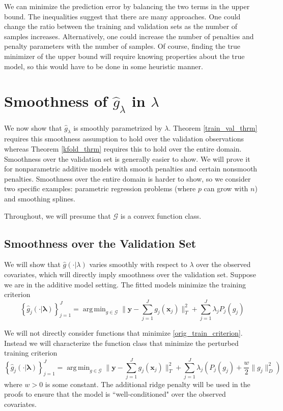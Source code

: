 \documentclass[12pt]{article}
\DeclareMathOperator*{\argmin}{arg\,min}
\begin{document}
We can minimize the prediction error by balancing the two terms in the upper bound. The inequalities suggest that there are many approaches. One could change the ratio between the training and validation sets as the number of samples increases. Alternatively, one could increase the number of penalties and penalty parameters with the number of samples. Of course, finding the true minimizer of the upper bound will require knowing properties about the true model, so this would have to be done in some heuristic manner.

\section{Smoothness of $\hat{g}_\lambda$ in $\lambda$}
\label{sec:entropy}

We now show that $\hat{g}_\lambda$ is smoothly parametrized by $\lambda$. Theorem \ref{train_val_thrm} requires this smoothness assumption to hold over the validation observations whereas Theorem \ref{kfold_thrm} requires this to hold over the entire domain. Smoothness over the validation set is generally easier to show. We will prove it for nonparametric additive models with smooth penalties and certain nonsmooth penalties. Smoothness over the entire domain is harder to show, so we consider two specific examples: parametric regression problems (where $p$ can grow with $n$) and smoothing splines.

Throughout, we will presume that $\mathcal{G}$ is a convex function class.

\subsection{Smoothness over the Validation Set}
\label{sec:smoothness_validation}
We will show that $\hat{g}(\cdot | \lambda)$ varies smoothly with respect to $\lambda$ over the observed covariates, which will directly imply smoothness over the validation set. Suppose we are in the additive model setting. The fitted models minimize the training criterion
\begin{equation}
\label{orig_train_criterion}
\left\{ \hat{g}_j(\cdot | \boldsymbol \lambda) \right \}_{j=1}^J = \argmin_{g\in \mathcal{G}} \| \boldsymbol y -  \sum_{j=1}^J g_j(\boldsymbol x_j) \|^2_T + \sum_{j=1}^J \lambda_j P_j(g_j)
\end{equation}

We will not directly consider functions that minimize \eqref{orig_train_criterion}. Instead we will characterize the function class that minimize the perturbed training criterion
\begin{equation}
\label{train_crit_ridge}
\left\{ \hat{g}_j(\cdot | \boldsymbol \lambda) \right \}_{j=1}^J = \argmin_{g\in \mathcal{G}} \| \boldsymbol y -  \sum_{j=1}^J g_j(\boldsymbol x_j) \|^2_T + \sum_{j=1}^J \lambda_j \left ( P_j(g_j) + \frac{w}{2} \| g_j \|^2_D \right )
\end{equation}
where $w > 0$ is some constant. The additional ridge penalty will be used in the proofs to ensure that the model is ``well-conditioned" over the observed covariates.
\end{document}
